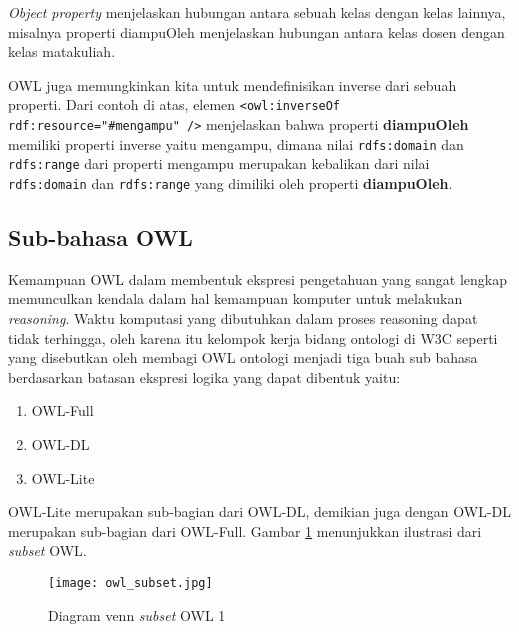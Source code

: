 \emph{Object property} menjelaskan hubungan antara sebuah kelas dengan kelas lainnya, misalnya properti diampuOleh menjelaskan hubungan antara kelas dosen dengan kelas matakuliah. 


OWL juga memungkinkan kita untuk mendefinisikan inverse dari sebuah properti. Dari contoh di atas, elemen \texttt{<owl:inverseOf rdf:resource="\#mengampu" />} menjelaskan bahwa properti \textbf{diampuOleh} memiliki properti inverse yaitu mengampu, dimana nilai \texttt{rdfs:domain} dan \texttt{rdfs:range} dari properti mengampu merupakan kebalikan dari nilai \texttt{rdfs:domain} dan \texttt{rdfs:range} yang dimiliki oleh properti \textbf{diampuOleh}.

\subsection{Sub-bahasa OWL}
Kemampuan OWL dalam membentuk ekspresi pengetahuan yang sangat lengkap memunculkan kendala dalam hal kemampuan komputer untuk melakukan \emph{reasoning}. Waktu komputasi yang dibutuhkan dalam proses reasoning dapat tidak terhingga, oleh karena itu kelompok kerja bidang ontologi di W3C seperti yang disebutkan oleh \citet*{mcguinness_vanharmelen} membagi OWL ontologi menjadi tiga buah sub bahasa berdasarkan batasan ekspresi logika yang dapat dibentuk yaitu:
\begin{enumerate}
	\item OWL-Full
	\item OWL-DL
	\item OWL-Lite
\end{enumerate}
OWL-Lite merupakan sub-bagian dari OWL-DL, demikian juga dengan OWL-DL merupakan sub-bagian dari OWL-Full. Gambar \ref{fig:owl_subset} menunjukkan ilustrasi dari \emph{subset} OWL.
\begin{figure}[h]
	\centering
	\texttt{[image: owl\_subset.jpg]}
	\caption{Diagram venn \emph{subset} OWL 1}
	\label{fig:owl_subset}
\end{figure}